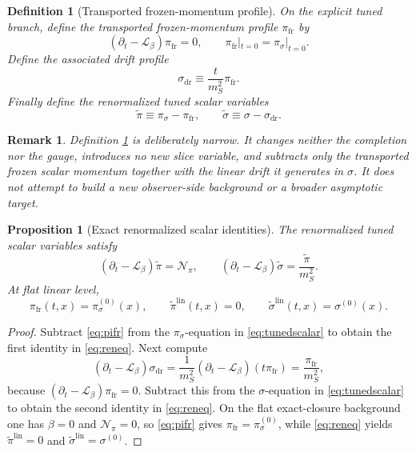 \documentclass[11pt]{article}
\newcommand{\Ell}{\mathcal{L}}
\newtheorem{definition}{Definition}
\newtheorem{proposition}{Proposition}
\newtheorem{remark}{Remark}
\begin{document}
\begin{definition}[Transported frozen-momentum profile]
\label{def:pifr}
On the explicit tuned branch, define the \emph{transported frozen-momentum profile} \(\pi_{\mathrm{fr}}\) by
\begin{equation}
(\partial_t-\Ell_\beta)\pi_{\mathrm{fr}}=0,
\qquad
\pi_{\mathrm{fr}}|_{t=0}=\pi_\sigma|_{t=0}.
\label{eq:pifr}
\end{equation}
Define the associated drift profile
\begin{equation}
\sigma_{\mathrm{dr}}
\equiv
\frac{t}{m_S^2}\pi_{\mathrm{fr}}.
\label{eq:sigmadr}
\end{equation}
Finally define the renormalized tuned scalar variables
\begin{equation}
\widetilde{\pi}\equiv \pi_\sigma-\pi_{\mathrm{fr}},
\qquad
\widetilde{\sigma}\equiv \sigma-\sigma_{\mathrm{dr}}.
\label{eq:renvars}
\end{equation}
\end{definition}

\begin{remark}
Definition \ref{def:pifr} is deliberately narrow. It changes neither the completion nor the gauge, introduces no new slice variable, and subtracts only the transported frozen scalar momentum together with the linear drift it generates in \(\sigma\). It does not attempt to build a new observer-side background or a broader asymptotic target.
\end{remark}

\begin{proposition}[Exact renormalized scalar identities]
\label{prop:reneq}
The renormalized tuned scalar variables satisfy
\begin{equation}
(\partial_t-\Ell_\beta)\widetilde{\pi}
=
\mathcal N_\pi,
\qquad
(\partial_t-\Ell_\beta)\widetilde{\sigma}
=
\frac{\widetilde{\pi}}{m_S^2}.
\label{eq:reneq}
\end{equation}
At flat linear level,
\begin{equation}
\pi_{\mathrm{fr}}(t,x)=\pi_\sigma^{(0)}(x),
\qquad
\widetilde{\pi}^{\mathrm{lin}}(t,x)=0,
\qquad
\widetilde{\sigma}^{\mathrm{lin}}(t,x)=\sigma^{(0)}(x).
\label{eq:flatren}
\end{equation}
\end{proposition}

\begin{proof}
Subtract \eqref{eq:pifr} from the \(\pi_\sigma\)-equation in \eqref{eq:tunedscalar} to obtain the first identity in \eqref{eq:reneq}. Next compute
\[
(\partial_t-\Ell_\beta)\sigma_{\mathrm{dr}}
=
\frac{1}{m_S^2}(\partial_t-\Ell_\beta)(t\pi_{\mathrm{fr}})
=
\frac{\pi_{\mathrm{fr}}}{m_S^2},
\]
because \((\partial_t-\Ell_\beta)\pi_{\mathrm{fr}}=0\). Subtract this from the \(\sigma\)-equation in \eqref{eq:tunedscalar} to obtain the second identity in \eqref{eq:reneq}. On the flat exact-closure background one has \(\beta=0\) and \(\mathcal N_\pi=0\), so \eqref{eq:pifr} gives \(\pi_{\mathrm{fr}}=\pi_\sigma^{(0)}\), while \eqref{eq:reneq} yields \(\widetilde{\pi}^{\mathrm{lin}}=0\) and \(\widetilde{\sigma}^{\mathrm{lin}}=\sigma^{(0)}\).
\end{proof}
\end{document}
